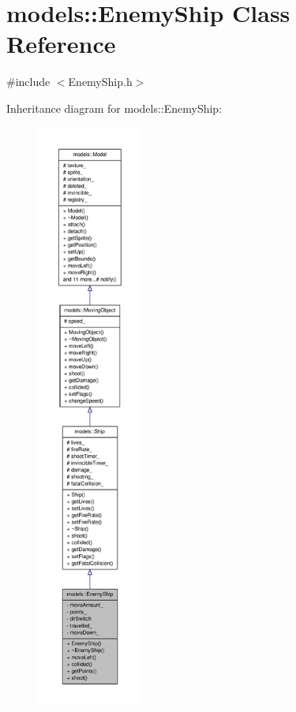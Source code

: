 \hypertarget{classmodels_1_1EnemyShip}{\section{models\-:\-:\-Enemy\-Ship \-Class \-Reference}
\label{d1/d22/classmodels_1_1EnemyShip}
}


{\ttfamily \#include $<$\-Enemy\-Ship.\-h$>$}



\-Inheritance diagram for models\-:\-:\-Enemy\-Ship\-:\nopagebreak
\begin{figure}[H]
\begin{center}
\leavevmode
\includegraphics[height=550pt]{d8/dfa/classmodels_1_1EnemyShip__inherit__graph}
\end{center}
\end{figure}


